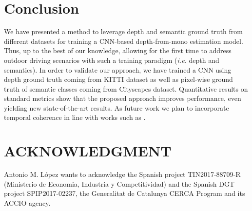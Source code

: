 \documentclass[letterpaper, 10 pt, conference]{ieeeconf}
\newcommand{\ie}{{\em i.e.}}
\begin{document}
\section{Conclusion}
\label{sec:conclusion}

We have presented a method to leverage depth and semantic ground truth from different datasets for training a CNN-based depth-from-mono estimation model. Thus, up to the best of our knowledge, allowing for the first time to address outdoor driving scenarios with such a training paradigm ({\ie} depth and semantics). In order to validate our approach, we have trained a CNN using depth ground truth coming from KITTI dataset as well as pixel-wise ground truth of semantic classes coming from Cityscapes dataset. Quantitative results on standard metrics show that the proposed approach improves performance, even yielding new state-of-the-art results. As future work we plan to incorporate temporal coherence in line with works such as \cite{Zhou:2017}.


 
\section*{ACKNOWLEDGMENT}
Antonio M. L\'opez wants to acknowledge the Spanish project TIN2017-88709-R (Ministerio de Economia, Industria y Competitividad) and the Spanish DGT project SPIP2017-02237, the Generalitat de Catalunya CERCA Program and its ACCIO agency.



\end{document}
